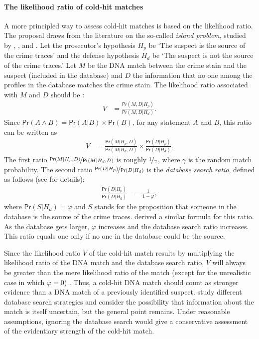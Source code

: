 \documentclass{article}
\newcommand{\pr}{\mathsf{Pr}}
\begin{document}
\paragraph{The likelihood ratio of cold-hit matches}



A more principled way to assess cold-hit matches is based on the likelihood ratio.  The proposal  draws from the literature on  the so-called \emph{island problem}, studied by \citet{eggleston1978evidence},  \citet{dawid1994island}, and \citet{dawid1996CoherentAnalysisForensic}.
Let the prosecutor's hypothesis $H_p$ be `The suspect is the source of the crime traces' and the defense hypothesis $H_d$ be `The suspect is not the source of the crime traces.'  Let $M$ be the DNA  match between the crime stain and the suspect (included in the database) and $D$ the information that no one among the %
profiles in the database matches the crime stain.  The likelihood ratio associated with $M$ and $D$ should be \citep{balding1996EvaluatingDNAProfilea, taroni2006bayesian}:
\begin{align*}
V & = \frac{\pr(M,D\vert H_p)}{\pr(M,D\vert H_d)}.
\end{align*}
Since $\pr(A\wedge B)=\pr(A\vert B)\times \pr(B)$, for any statement $A$ and $B$, this ratio can be written as
\begin{align*}
V & = \frac{\pr(M\vert H_p,D)}{\pr(M\vert H_d,D)} \times \frac{\pr(D\vert H_p)}{\pr(D\vert H_d)}.
\end{align*}
The first ratio $\nicefrac{\pr(M\vert H_p,D)}{\pr(M\vert H_d,D)}$ is roughly $\nicefrac{1}{\gamma}$, where $\gamma$ is the random match probability. The second ratio $\nicefrac{\pr(D\vert H_p)}{\pr(D\vert H_d)}$ is the \emph{database search ratio}, defined as follows (see \cite{balding1996EvaluatingDNAProfilea, taroni2006bayesian} for details):
\begin{align*}
\frac{\pr(D\vert H_p)}{\pr(D\vert H_d)} & = \frac{1}{1-\varphi},
\end{align*}
where $\pr(S | H_d)=\varphi$ and $S$ stands for the proposition that someone in the database is the source of the crime traces. \citet{donnelly1999DNADatabaseSearches} derived a similar formula for this ratio.  As the database gets larger, $\varphi$ increases and the database search ratio increases. This ratio equals one only if no one in the database could be the source. 


Since the likelihood ratio $V$ of the cold-hit match results by multiplying the likelihood ratio of the DNA match and the database search ratio, $V$ will always be greater than the mere likelihood ratio of the match (except for the unrealistic case in which $\varphi=0$) . Thus, a cold-hit DNA match should count as stronger evidence than a DNA match of a previously identified suspect. \citet{dawid1996CoherentAnalysisForensic}  study different database search strategies and consider the possibility that information about the match is itself uncertain, but the general point remains. Under reasonable assumptions, ignoring the database search would give a conservative assessment of the evidentiary strength of the cold-hit match.
\end{document}
